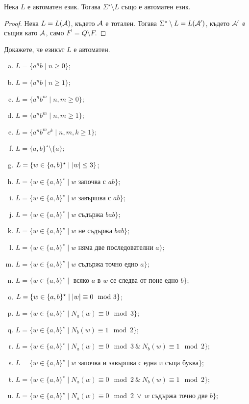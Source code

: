 \begin{lemma}
  Нека $L$ е автоматен език.
  Тогава $\Sigma^\star\setminus L$ също е автоматен език.
\end{lemma}
\begin{proof}
  Нека $L = L(\mathcal{A})$, където $\mathcal{A}$ е тотален.
  Тогава $\Sigma^\star\setminus L = L(\mathcal{A}^\prime)$,
  където $\mathcal{A}^\prime$ е същия като $\mathcal{A}$, само $F^\prime = Q\setminus F$.
\end{proof}


\begin{prb}
  Докажете, че езикът $L$ е автоматен.
  \begin{enumerate}[a)]
  \item 
    $L = \{a^nb\mid n \geq 0\}$;
  \item
    $L = \{a^nb\mid n \geq 1\}$;
  \item
    $L = \{a^nb^m\mid n,m \geq 0\}$;
  \item
    $L = \{a^nb^m\mid n,m \geq 1\}$;
  \item
    $L = \{a^nb^mc^k\mid n,m,k \geq 1\}$;
  \item
    $L = \{a,b\}^\star \setminus \{a\}$;
  \item
    $L = \{w \in \{a,b\}^\star\mid \vert{w}\vert \leq 3\}$;
  \item
    $L = \{w \in \{a,b\}^\star \mid w \mbox{ започва с }ab\}$;
  \item
    $L = \{w \in \{a,b\}^\star \mid w \mbox{ завършва с }ab\}$;
  \item
    $L = \{w \in \{a,b\}^\star \mid w \mbox{ съдържа }bab\}$;
  \item
    $L = \{w \in \{a,b\}^\star \mid w \mbox{ не съдържа }bab\}$;
  \item
    $L = \{w \in \{a,b\}^\star \mid w \mbox{ няма две последователни }a\}$;
  \item
    $L = \{w \in \{a,b\}^\star \mid w \mbox{ съдържа точно едно }a\}$;
  \item
    $L = \{w \in \{a,b\}^\star \mid \mbox{ всяко }a\mbox{ в }w\mbox{ се следва от поне едно }b\}$;
  \item
    $L = \{w \in \{a,b\}^\star \mid \vert{w}\vert \equiv 0 \mod 3\}$;
  \item
    $L = \{w \in \{a,b\}^\star \mid N_a(w) \equiv 0 \mod 3\}$;
  \item
    $L = \{w \in \{a,b\}^\star \mid N_b(w) \equiv 1 \mod 2\}$;
  \item
    $L = \{w \in \{a,b\}^\star \mid N_a(w) \equiv 0 \mod 3\ \&\ N_b(w) \equiv 1 \mod 2\}$;
  \item
    $L = \{w \in \{a,b\}^\star \mid w\mbox{ започва и завършва с една и съща буква}\}$;
  \item
    $L = \{w \in \{a,b\}^\star \mid N_a(w) \equiv 0 \mod 2\ \&\ N_b(w) \equiv 1 \mod 2\}$;
  \item
    $L = \{w \in \{a,b\}^\star \mid N_a(w) \equiv 0 \mod 2\ \vee\ w \mbox{ съдържа точно две }b\}$;
  \end{enumerate}
\end{prb}


